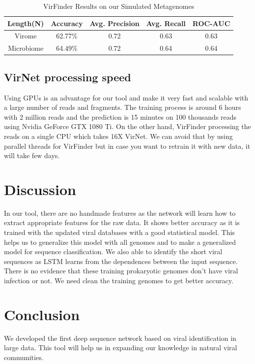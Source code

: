 \documentclass[conference]{IEEEtran}
\begin{document}
\begin{table}[h!]
	\centering
	\begin{tabular}{||c c c c c||} 
		Length(N) &	Accuracy & Avg. Precision & Avg. Recall &	ROC-AUC \\ [0.5ex] 
		\hline\hline
		Virome &	62.77\%	& 0.72 & 0.63 & 0.63 \\
		Microbiome &	64.49\% &	0.72 & 0.64 & 0.64 \\ [1ex]
	\end{tabular}
	\caption{VirFinder Results on our Simulated Metagenomes}
	\label{table:virfinder_results_simulated}
\end{table}

\subsection{VirNet processing speed}
Using GPUs is an advantage for our tool and make it very fast and scalable with a large number of reads and fragments. The training process is around 6 hours with 2 million reads and the prediction is 15 minutes on 100 thousands reads using Nvidia GeForce GTX 1080 Ti. On the other hand, VirFinder processing the reads on a single CPU which takes 16X VirNet. We can avoid that by using parallel threads for VirFinder but in case you want to retrain it with new data, it will take few days. 

\section{Discussion}

In our tool, there are no handmade features as the network will learn how to extract appropriate features for the raw data. It shows better accuracy as it is trained with the updated viral databases with a good statistical model. This helps us to generalize this model with all genomes and to make a generalized model for sequence classification. We also able to identify the short viral sequences as LSTM learns from the dependences between the input sequence. 
There is no evidence that these training prokaryotic genomes don't have viral infection or not. We need clean the training genomes to get better accuracy.

\section{Conclusion}

We developed the first deep sequence network based on viral identification in large data. This tool will help us in expanding our knowledge in natural viral communities.
\end{document}

